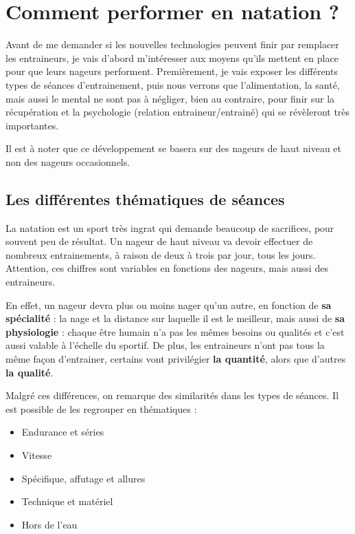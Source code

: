 \section{Comment performer en natation ?}

Avant de me demander si les nouvelles technologies peuvent finir par remplacer les entraineurs, je vais d'abord m'intéresser aux moyens qu'ils mettent en place pour que leurs nageurs performent. Premièrement, je vais exposer les différents types de séances d'entrainement, puis nous verrons que l'alimentation, la santé, mais aussi le mental ne sont pas à négliger, bien au contraire, pour finir sur la récupération et la psychologie (relation entraineur/entrainé) qui se révèleront très importantes.

Il est à noter que ce développement se basera sur des nageurs de haut niveau et non des nageurs occasionnels.

\subsection{Les différentes thématiques de séances}

La natation est un sport très ingrat qui demande beaucoup de sacrifices, pour souvent peu de résultat. Un nageur de haut niveau va devoir effectuer de nombreux entrainements, à raison de deux à trois par jour, tous les jours. Attention, ces chiffres sont variables en fonctions des nageurs, mais aussi des entraineurs.

\vspace{12pt}

En effet, un nageur devra plus ou moins nager qu'un autre, en fonction de \textbf{sa spécialité} : la nage et la distance sur laquelle il est le meilleur, mais aussi de \textbf{sa physiologie} : chaque être humain n'a pas les mêmes besoins ou qualités et c'est aussi valable à l'échelle du sportif. De plus, les entraineurs n'ont pas tous la même façon d'entrainer, certains vont privilégier \textbf{la quantité}, alors que d'autres \textbf{la qualité}.

\vspace{12pt}

Malgré ces différences, on remarque des similarités dans les types de séances. Il est possible de les regrouper en thématiques :
\begin{itemize}
 \item Endurance et séries
 \item Vitesse
 \item Spécifique, affutage et allures
 \item Technique et matériel
 \item Hors de l’eau
\end{itemize}

